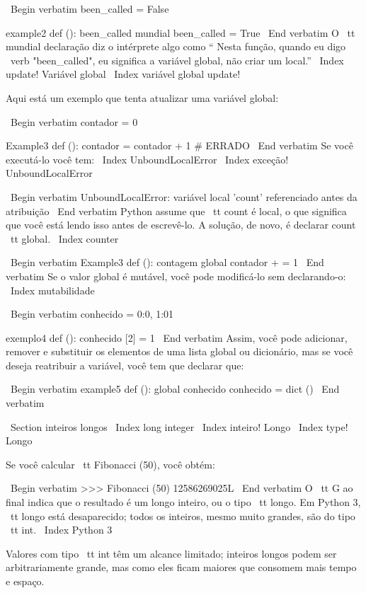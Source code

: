 \documentclass[10pt]{book}
\begin{document}
{{{{{{{\ Begin {verbatim}
been_called = False

example2 def ():
    been_called mundial 
    been_called = True
\ End {verbatim}
%
O {\ tt mundial} declaração diz o intérprete
algo como `` Nesta função, quando eu digo \ verb "been_called", eu
significa a variável global, não criar um local.''
\ Index {update! Variável global}
\ Index {variável global update!}

Aqui está um exemplo que tenta atualizar uma variável global:

\ Begin {verbatim}
contador = 0

Example3 def ():
    contador = contador + 1 # ERRADO
\ End {verbatim}
%
Se você executá-lo você tem:
\ Index {} UnboundLocalError
\ Index {exceção! UnboundLocalError}

\ Begin {verbatim}
UnboundLocalError: variável local 'count' referenciado antes da atribuição
\ End {verbatim}
%
Python assume que {\ tt count} é local, o que significa
que você está lendo isso antes de escrevê-lo. A solução, de novo,
é declarar {count \ tt} global.
\ Index {counter}

\ Begin {verbatim}
Example3 def ():
    contagem global
    contador + = 1
\ End {verbatim}
%
Se o valor global é mutável, você pode modificá-lo sem
declarando-o:
\ Index {} mutabilidade

\ Begin {verbatim}
conhecido = {0:0, 1:01}

exemplo4 def ():
    conhecido [2] = 1
\ End {verbatim}
%
Assim, você pode adicionar, remover e substituir os elementos de uma lista global ou
dicionário, mas se você deseja reatribuir a variável, você
tem que declarar que:

\ Begin {verbatim}
example5 def ():
    global conhecido
    conhecido = dict ()
\ End {verbatim}
%

\ Section {inteiros longos}
\ Index {long integer}
\ Index {inteiro! Longo}
\ Index {type! Longo}

Se você calcular {\ tt Fibonacci (50)}, você obtém:

\ Begin {verbatim}
>>> Fibonacci (50)
12586269025L
\ End {verbatim}
%
O {\ tt G} ao final indica que o resultado é um longo
inteiro, ou o tipo {\ tt longo}. Em Python 3, {\ tt longo} está desaparecido; todos os inteiros,
mesmo muito grandes, são do tipo {\ tt int}.
\ Index {Python 3}

Valores com tipo {\ tt int} têm um alcance limitado;
inteiros longos podem ser arbitrariamente grande, mas como eles ficam maiores
que consomem mais tempo e espaço.

}}}}}}}
\end{document}
